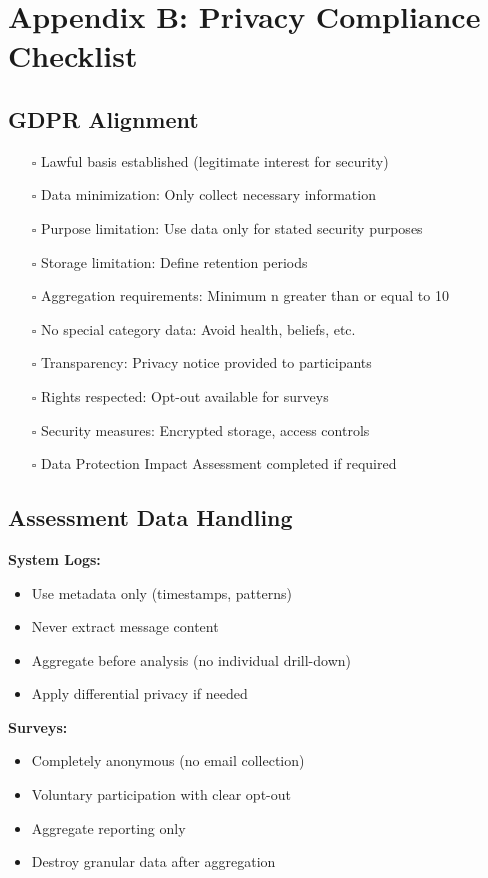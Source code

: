 \documentclass[11pt,a4paper]{article}
\begin{document}
\section{Appendix B: Privacy Compliance Checklist}

\subsection{GDPR Alignment}

\begin{itemize}
\item[$\square$] Lawful basis established (legitimate interest for security)
\item[$\square$] Data minimization: Only collect necessary information
\item[$\square$] Purpose limitation: Use data only for stated security purposes
\item[$\square$] Storage limitation: Define retention periods
\item[$\square$] Aggregation requirements: Minimum n greater than or equal to 10
\item[$\square$] No special category data: Avoid health, beliefs, etc.
\item[$\square$] Transparency: Privacy notice provided to participants
\item[$\square$] Rights respected: Opt-out available for surveys
\item[$\square$] Security measures: Encrypted storage, access controls
\item[$\square$] Data Protection Impact Assessment completed if required
\end{itemize}

\subsection{Assessment Data Handling}

\textbf{System Logs:}
\begin{itemize}
\item Use metadata only (timestamps, patterns)
\item Never extract message content
\item Aggregate before analysis (no individual drill-down)
\item Apply differential privacy if needed
\end{itemize}

\textbf{Surveys:}
\begin{itemize}
\item Completely anonymous (no email collection)
\item Voluntary participation with clear opt-out
\item Aggregate reporting only
\item Destroy granular data after aggregation
\end{itemize}
\end{document}
